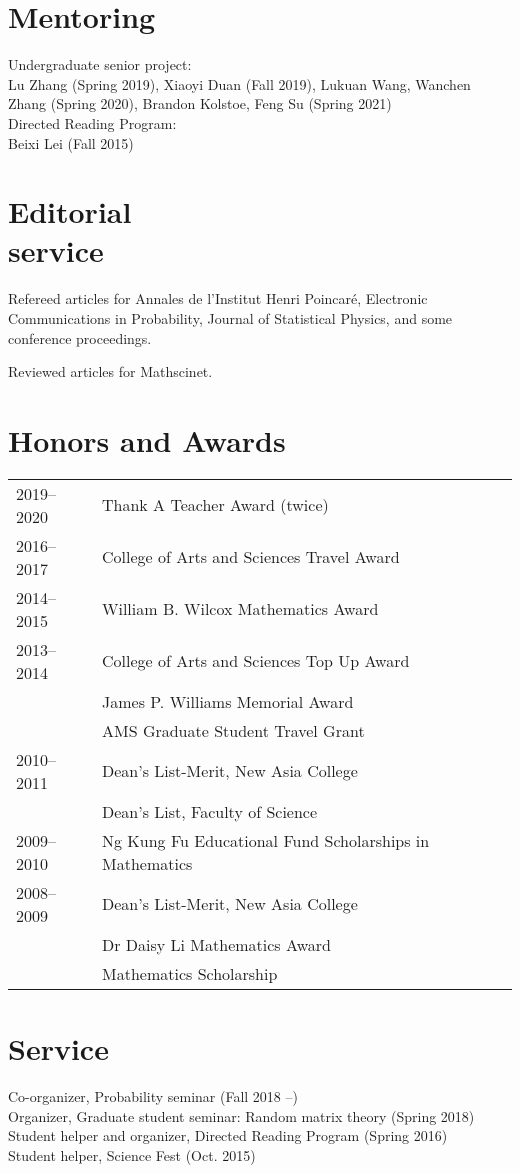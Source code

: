 \documentclass[margin,line,pifont,palatino,courier]{res}
\begin{document}
\begin{resume}
\section{\sc Mentoring}
Undergraduate senior project: \\
Lu Zhang (Spring 2019), Xiaoyi Duan (Fall 2019), Lukuan Wang, Wanchen Zhang (Spring 2020), Brandon Kolstoe, Feng Su (Spring 2021)\\
Directed Reading Program: \\
Beixi Lei (Fall 2015)

\section{\sc Editorial\\service}
Refereed articles for Annales de l'Institut Henri Poincar\'e, Electronic Communications in Probability, Journal of Statistical Physics, and some conference proceedings.

Reviewed articles for Mathscinet.


\section{\sc Honors and Awards}

\begin{tabular}{@{}p{0.8in}p{4in}}
2019--2020 & Thank A Teacher Award (twice)\\
2016--2017 & College of Arts and Sciences Travel Award\\
2014--2015 & William B. Wilcox Mathematics Award\\
2013--2014 & College of Arts and Sciences Top Up Award\\
           & James P. Williams Memorial Award\\
           & AMS Graduate Student Travel Grant\\
2010--2011 & Dean's List-Merit, New Asia College\\
           & Dean's List, Faculty of Science  \\
2009--2010 & Ng Kung Fu Educational Fund Scholarships in Mathematics  \\
2008--2009 & Dean's List-Merit, New Asia College  \\
 & Dr Daisy Li Mathematics Award \\
 & Mathematics Scholarship\\
\end{tabular}

\section{\sc Service}
Co-organizer, Probability seminar (Fall 2018 --)\\
Organizer, Graduate student seminar: Random matrix theory (Spring 2018)\\
Student helper and organizer, Directed Reading Program (Spring 2016)\\
Student helper, Science Fest (Oct. 2015)


\end{resume}
\end{document}
